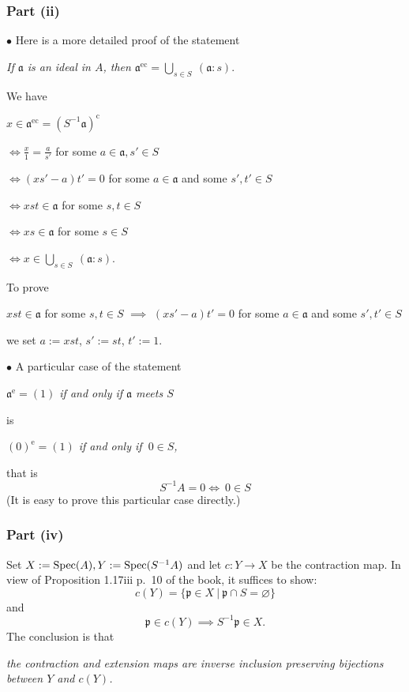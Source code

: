 \documentclass[parskip=half,fontsize=12pt]{scrartcl}%
\newcommand{\oo}{\operatorname}\newcommand{\ooo}{\operatorname*}
\newcommand{\mf}{\mathfrak}
\newcommand{\ppp}{\mf p}
\newcommand{\bu}{\bullet}
\newcommand{\ds}{\displaystyle}
\begin{document}
\subsubsection{Part (ii)}

$\bu $ Here is a more detailed proof of the statement 

\emph{If $\mf a$ is an ideal in $A$, then $\mf a^{\oo{ec}}=\bigcup_{s\in S}\ (\mf a:s)$}.

We have 

$x\in\mf a^{\oo{ec}}=(S^{-1}\mf a)^{\oo c}$

$\ds\iff\frac{x}{1}=\frac{a}{s'}$ for some $a\in\mf a,s'\in S$ 

$\iff(xs'-a)t'=0$ for some $a\in\mf a$ and some $s',t'\in S$ 

$\iff xst\in\mf a$ for some $s,t\in S$

$\iff xs\in\mf a$ for some $s\in S$

$\iff x\in\bigcup_{s\in S}\ (\mf a:s)$.

To prove 

$xst\in\mf a$ for some $s,t\in S$ $\implies$ $(xs'-a)t'=0$ for some $a\in\mf a$ and some $s',t'\in S$

we set $a:=xst$, $s':=st$, $t':=1$.%

$\bu$ A particular case of the statement 

\emph{$\mf a^{\oo e}=(1)$ if and only if $\mf a$ meets $S$}

is 

\emph{$(0)^{\oo e}=(1)$ if and only if $\ 0\in S$,}

that is 
\begin{equation}\label{s-1a}
S^{-1}A=0\iff\ 0\in S
\end{equation}
(It is easy to prove this particular case directly.)

\subsubsection{Part (iv)}\label{prcor}%

Set $X:=\operatorname{Spec}(A),Y:=\operatorname{Spec}(S^{-1}A)$ and let $c:Y\to X$ be the contraction map. In view of Proposition 1.17iii p.~10 of the book, it suffices to show:
$$
c(Y)=\{\ppp\in X\ |\ \ppp\cap S=\varnothing\}
$$ 
and 
$$
\ppp\in c(Y)\implies S^{-1}\ppp\in X.
$$ 
The conclusion is that 

\emph{the contraction and extension maps are inverse inclusion preserving bijections between $Y$ and $c(Y)$.} 
\end{document}
